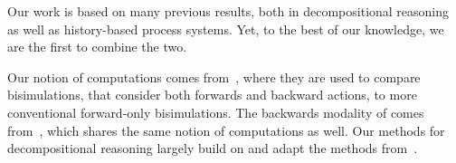 Our work is based on many previous results, both in decompositional reasoning
as well as history-based process systems. Yet, to the best of our knowledge, we
are the first to combine the two.

Our notion of computations comes from~\cite{DeNicola:1990}, where they are used
to compare bisimulations, that consider both forwards and backward actions, to
more conventional forward-only bisimulations. The backwards modality of \HMLpast
comes from~\cite{HennessyS85}, which shares the same notion of computations
as well.
%
Our methods for decompositional reasoning largely build on and adapt the methods
from~\cite{anna87,Larsen91,Fokkink03b}. 